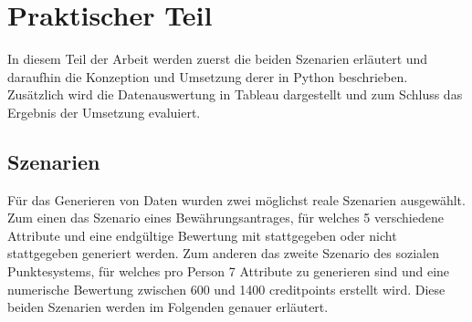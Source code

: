 \chapter{Praktischer Teil}
\label{sec:praktischerteil}
\begin{onehalfspace}
In diesem Teil der Arbeit werden zuerst die beiden Szenarien erläutert und daraufhin die Konzeption und Umsetzung derer in Python beschrieben. Zusätzlich wird die Datenauswertung in Tableau dargestellt und zum Schluss das Ergebnis der Umsetzung evaluiert.
\section{Szenarien}
\label{subsec:szenarien}
Für das Generieren von Daten wurden zwei möglichst reale Szenarien ausgewählt. Zum einen das Szenario eines Bewährungsantrages, für welches 5 verschiedene Attribute und eine endgültige Bewertung mit stattgegeben oder nicht stattgegeben generiert werden. Zum anderen das zweite Szenario des sozialen Punktesystems, für welches pro Person 7 Attribute zu generieren sind und eine numerische Bewertung zwischen 600 und 1400 creditpoints erstellt wird. Diese beiden Szenarien werden im Folgenden genauer erläutert.

\end{onehalfspace}
